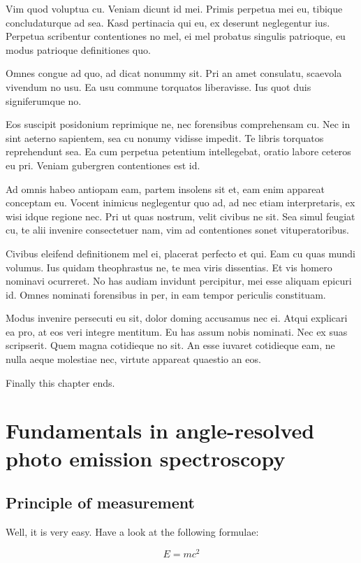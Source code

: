 \documentclass[12pt,oneside,english]{book}
\begin{document}
Vim quod voluptua cu. Veniam dicunt id mei. Primis perpetua mei eu, tibique concludaturque ad sea. Kasd pertinacia qui eu, ex deserunt neglegentur ius. Perpetua scribentur contentiones no mel, ei mel probatus singulis patrioque, eu modus patrioque definitiones quo.

Omnes congue ad quo, ad dicat nonummy sit. Pri an amet consulatu, scaevola vivendum no usu. Ea usu commune torquatos liberavisse. Ius quot duis signiferumque no.

Eos suscipit posidonium reprimique ne, nec forensibus comprehensam cu. Nec in sint aeterno sapientem, sea cu nonumy vidisse impedit. Te libris torquatos reprehendunt sea. Ea cum perpetua petentium intellegebat, oratio labore ceteros eu pri. Veniam gubergren contentiones est id.

Ad omnis habeo antiopam eam, partem insolens sit et, eam enim appareat conceptam eu. Vocent inimicus neglegentur quo ad, ad nec etiam interpretaris, ex wisi idque regione nec. Pri ut quas nostrum, velit civibus ne sit. Sea simul feugiat cu, te alii invenire consectetuer nam, vim ad contentiones sonet vituperatoribus.

Civibus eleifend definitionem mel ei, placerat perfecto et qui. Eam cu quas mundi volumus. Ius quidam theophrastus ne, te mea viris dissentias. Et vis homero nominavi ocurreret. No has audiam invidunt percipitur, mei esse aliquam epicuri id. Omnes nominati forensibus in per, in eam tempor periculis constituam.

Modus invenire persecuti eu sit, dolor doming accusamus nec ei. Atqui explicari ea pro, at eos veri integre mentitum. Eu has assum nobis nominati. Nec ex suas scripserit. Quem magna cotidieque no sit. An esse iuvaret cotidieque eam, ne nulla aeque molestiae nec, virtute appareat quaestio an eos.

Finally this chapter ends.

\chapter{Fundamentals in angle-resolved photo emission spectroscopy}
\section{Principle of measurement}

Well, it is very easy. Have a look at the following formulae:

\[E=mc^{2}\]
\end{document}
